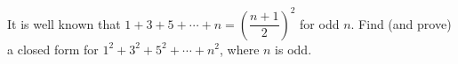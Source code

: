 It is well known that $1+3+5+\cdots+n=\left(\dfrac{n+1}{2}\right)^2$ for odd $n$. Find (and prove) a closed form for $1^2+3^2+5^2+\cdots+n^2$, where $n$ is odd.
